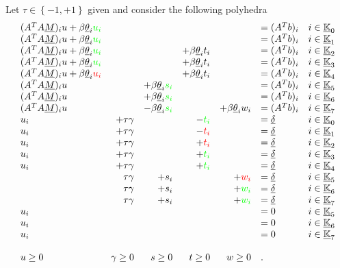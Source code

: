 \documentclass[fleqn]{report} %
\begin{document}
Let $\tau\in\left\{-1, +1\right\}$ given and consider the following polyhedra
\[
\begin{array}{lrrrrll}
(A^TA\underline{M})_iu+\beta\underline{\theta}_i\textcolor{green}{u_i}&&&&&=(A^Tb)_i&i\in\underline{\mathbb{K}}_0\\
(A^TA\underline{M})_iu+\beta\underline{\theta}_i\textcolor{green}{u_i}&&&&&=(A^Tb)_i&i\in\underline{\mathbb{K}}_1\\
(A^TA\underline{M})_iu+\beta\underline{\theta}_i\textcolor{green}{u_i}&&&+\beta\underline{\theta}_it_i&&=(A^Tb)_i&i\in\underline{\mathbb{K}}_2\\
(A^TA\underline{M})_iu+\beta\underline{\theta}_i\textcolor{green}{u_i}&&&+\beta\underline{\theta}_it_i&&=(A^Tb)_i&i\in\underline{\mathbb{K}}_3\\
(A^TA\underline{M})_iu+\beta\underline{\theta}_i\textcolor{red}{u_i}&&&+\beta\underline{\theta}_it_i&&=(A^Tb)_i&i\in\underline{\mathbb{K}}_4\\
(A^TA\underline{M})_iu&&+\beta\underline{\theta}_i\textcolor{green}{s_i}&&&=(A^Tb)_i&i\in\underline{\mathbb{K}}_5\\
(A^TA\underline{M})_iu&&+\beta\underline{\theta}_i\textcolor{green}{s_i}&&&=(A^Tb)_i&i\in\underline{\mathbb{K}}_6\\
(A^TA\underline{M})_iu&&-\beta\underline{\theta}_i\textcolor{green}{s_i}&&+\beta\underline{\theta}_iw_i&=(A^Tb)_i&i\in\underline{\mathbb{K}}_7\\
u_i&+\tau\gamma&&-\textcolor{green}{t_i}&&=\underline{\delta}&i\in\underline{\mathbb{K}}_0\\
u_i&+\tau\gamma&&-\textcolor{red}{t_i}&&=\underline{\delta}&i\in\underline{\mathbb{K}}_1\\
u_i&+\tau\gamma&&+\textcolor{red}{t_i}&&=\underline{\delta}&i\in\underline{\mathbb{K}}_2\\
u_i&+\tau\gamma&&+\textcolor{green}{t_i}&&=\underline{\delta}&i\in\underline{\mathbb{K}}_3\\
u_i&+\tau\gamma&&+\textcolor{green}{t_i}&&=\underline{\delta}&i\in\underline{\mathbb{K}}_4\\
&\tau\gamma&+s_i&&+\textcolor{red}{w_i}&=\underline{\delta}&i\in\underline{\mathbb{K}}_5\\
&\tau\gamma&+s_i&&+\textcolor{green}{w_i}&=\underline{\delta}&i\in\underline{\mathbb{K}}_6\\
&\tau\gamma&+s_i&&+\textcolor{green}{w_i}&=\underline{\delta}&i\in\underline{\mathbb{K}}_7\\
u_i&&&&&=0&i\in\underline{\mathbb{K}}_5\\
u_i&&&&&=0&i\in\underline{\mathbb{K}}_6\\
u_i&&&&&=0&i\in\underline{\mathbb{K}}_7\\
&&&&&\\
u\geq0&\gamma\geq0&s\geq0&t\geq0&w\geq0&.\\
\end{array} 
\]
\end{document}
